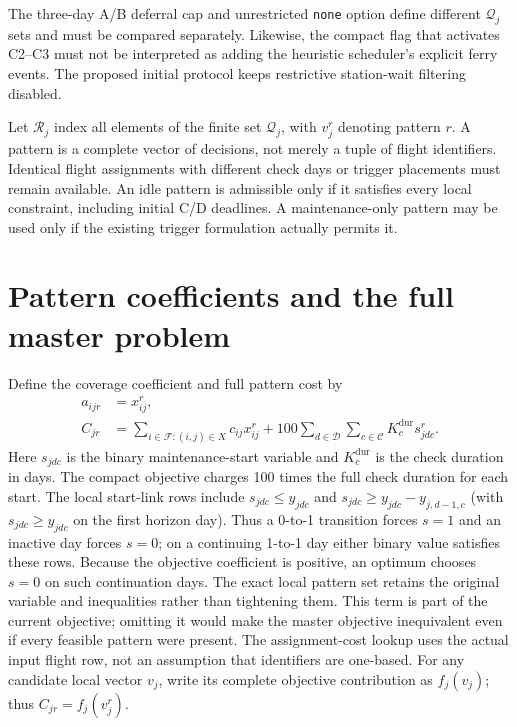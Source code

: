 The three-day A/B deferral cap and unrestricted \texttt{none} option define
different $\mathcal Q_j$ sets and must be compared separately. Likewise, the
compact flag that activates C2--C3 must not be interpreted as adding the
heuristic scheduler's explicit ferry events. The proposed initial protocol
keeps restrictive station-wait filtering disabled.

Let $\mathcal R_j$ index all elements of the finite set $\mathcal Q_j$, with
$v_j^r$ denoting pattern $r$. A pattern is a complete vector of decisions,
not merely a tuple of flight identifiers. Identical flight assignments with
different check days or trigger placements must remain available. An idle
pattern is admissible only if it satisfies every local constraint, including
initial C/D deadlines. A maintenance-only pattern may be used only if the
existing trigger formulation actually permits it.

\section{Pattern coefficients and the full master problem}
\label{sec:bp_master}

Define the coverage coefficient and full pattern cost by
\begin{align}
 a_{ijr}&=x_{ij}^r,\\
 C_{jr}&=\sum_{i\in\mathcal F:(i,j)\in X}c_{ij}x_{ij}^r
       +100\sum_{d\in\mathcal D}\sum_{c\in\mathcal C}
                    K_c^{\mathrm{dur}}s_{jdc}^r.
 \label{eq:bp_cost_coverage}
\end{align}
Here $s_{jdc}$ is the binary maintenance-start variable and
$K_c^{\mathrm{dur}}$ is the check duration in days. The compact objective
charges 100 times the full check duration for each start. The local start-link
rows include $s_{jdc}\le y_{jdc}$ and
$s_{jdc}\ge y_{jdc}-y_{j,d-1,c}$ (with $s_{jdc}\ge y_{jdc}$ on the first
horizon day). Thus a 0-to-1 transition forces $s=1$ and an inactive day forces
$s=0$; on a continuing 1-to-1 day either binary value satisfies these rows.
Because the objective coefficient is positive, an optimum chooses $s=0$ on
such continuation days. The exact local pattern set retains the original
variable and inequalities rather than tightening them. This term is part of
the current objective;
omitting it would make the master objective inequivalent even if every
feasible pattern were present. The assignment-cost lookup uses the actual
input flight row, not an assumption that identifiers are one-based. For any
candidate local vector $v_j$, write its complete objective contribution as
$f_j(v_j)$; thus $C_{jr}=f_j(v_j^r)$.


